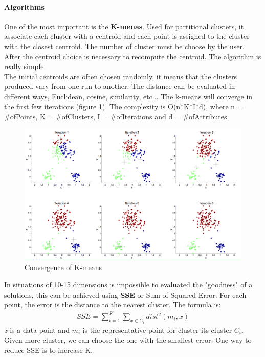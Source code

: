 \documentclass[12pt]{article}
\begin{document}
\paragraph{Algorithms} One of the most important is the \textbf{K-menas}. Used for partitional clusters, it associate each cluster with a centroid and each point is assigned to the cluster with the closest centroid. The number of cluster must be choose by the user. After the centroid choice is necessary to recompute the centroid. The algorithm is really simple.\\
The initial centroids are often chosen randomly, it means that the clusters produced vary from one run to another. The distance can be evaluated in different ways, Euclidean, cosine, similarity, etc... The k-means will converge in the first few iterations (figure \ref{fig:kmeansConve}). The complexity is O(n*K*I*d), where n = \#ofPoints, K = \#ofClusters, I = \#ofIterations and d = \#ofAttributes.
\begin{figure}[H]
  \includegraphics[width=\linewidth]{images/kmeansConve.png}
  \caption{Convergence of K-means}
  \label{fig:kmeansConve}
\end{figure}
In situations of 10-15 dimensions is impossible to evaluated the "goodness" of a solutions, this can be achieved using \textbf{SSE} or Sum of Squared Error. For each point, the error is the distance to the nearest cluster. The formula is:
\begin{equation}
  \begin{gathered}
    SSE = \sum^{K}_{i=1} \sum_{x \in C_i} dist^2(m_i, x)
  \end{gathered}
\end{equation}
\textit{x} is a data point and $m_i$ is the representative point for cluster its cluster $C_i$. Given more cluster, we can choose the one with the smallest error. One way to reduce SSE is to increase K.\\
\end{document}
